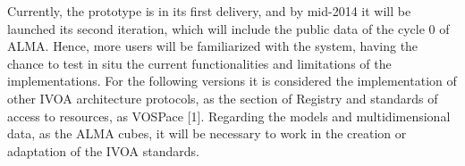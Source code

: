 \documentclass[11pt]{scrartcl}
\begin{document}
{{{\begin{minipage}[t]{0.95\linewidth}
{\begin{minipage}[t]{0.50\linewidth}
Currently, the prototype is in its first delivery, and by mid-2014 it will be
launched its second iteration, which will include the public data of the cycle
0 of ALMA. Hence, more users will be familiarized with the system, having the
chance to test in situ the current functionalities and limitations of the
implementations. For the following versions it is considered the
implementation of other IVOA architecture protocols, as the section of Registry
and standards of access to resources, as VOSPace [1]. %
Regarding the models and multidimensional data, as the ALMA cubes, it will be
necessary to work in the creation or adaptation of the IVOA standards.
			\end{minipage}

}
\end{minipage}
}\hfill
}}\hfill\mbox{}\\
\vfill
\end{document}
